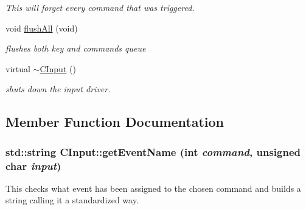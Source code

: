 \begin{DoxyCompactItemize}
\begin{DoxyCompactList}\small\item\em This will forget every command that was triggered. \item\end{DoxyCompactList}\item 
\hypertarget{class_c_input_a6bfd922a639a22b9fc17c87cdf675303}{
void \hyperlink{class_c_input_a6bfd922a639a22b9fc17c87cdf675303}{flushAll} (void)}
\label{class_c_input_a6bfd922a639a22b9fc17c87cdf675303}

\begin{DoxyCompactList}\small\item\em flushes both key and commands queue \item\end{DoxyCompactList}\item 
\hypertarget{class_c_input_a282370813c9dfe52799b1a1ec49e497e}{
virtual \hyperlink{class_c_input_a282370813c9dfe52799b1a1ec49e497e}{$\sim$CInput} ()}
\label{class_c_input_a282370813c9dfe52799b1a1ec49e497e}

\begin{DoxyCompactList}\small\item\em shuts down the input driver. \item\end{DoxyCompactList}\end{DoxyCompactItemize}


\subsection{Member Function Documentation}
\hypertarget{class_c_input_a9ec7be50e43345a0c70b9379fe092c16}{
\subsubsection[{getEventName}]{\setlength{\rightskip}{0pt plus 5cm}std::string CInput::getEventName (int {\em command}, \/  unsigned char {\em input})}}
\label{class_c_input_a9ec7be50e43345a0c70b9379fe092c16}


This checks what event has been assigned to the chosen command and builds a string calling it a standardized way. 


